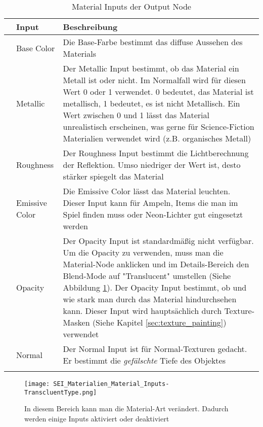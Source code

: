 \begin{longtable}{|p{4cm}|p{9.6cm}|}
    \hline
    \endfirsthead
    & \textbf{Input} & \textbf{Beschreibung} &\\
    \hline
    \endhead

    & Base Color & Die Base-Farbe bestimmt das diffuse Aussehen des Materials & \\

    & Metallic & Der Metallic Input bestimmt, ob das Material ein Metall ist oder nicht. Im Normalfall wird für
    diesen Wert 0 oder 1 verwendet. 0 bedeutet, das Material ist metallisch, 1 bedeutet, es ist nicht
    Metallisch. Ein Wert zwischen 0 und 1 lässt das Material unrealistisch erscheinen, was gerne
    für Science-Fiction Materialien verwendet wird (z.B. organisches Metall) & \\

    & Roughness & Der Roughness Input bestimmt die Lichtberechnung der Reflektion. Umso niedriger der Wert
    ist, desto stärker spiegelt das Material & \\

    & Emissive Color & Die Emissive Color lässt das Material leuchten. Dieser Input kann für Ampeln, Items die man im Spiel
    finden muss oder Neon-Lichter gut eingesetzt werden & \\

    & Opacity & Der Opacity Input ist standardmäßig nicht verfügbar. Um die Opacity zu verwenden, muss man die
    Material-Node anklicken und im Details-Bereich den Blend-Mode auf "Translucent" umstellen (Siehe
    Abbildung \ref{picture:translucent}). Der Opacity Input bestimmt, ob und wie stark man durch das Material hindurchsehen
    kann. Dieser Input wird hauptsächlich durch Texture-Masken (Siehe Kapitel \ref{sec:texture_painting}) verwendet & \\

    & Normal & Der Normal Input ist für Normal-Texturen gedacht. Er bestimmt die \textit{gefälschte} Tiefe des Objektes & \\

    \caption{Material Inputs der Output Node}
    \label{table:mat_inputs}
\end{longtable}

\begin{figure}[h]
    \centering
    \texttt{[image: SEI\_Materialien\_Material\_Inputs-TranscluentType.png]}
    \caption{In diesem Bereich kann man die Material-Art verändert. Dadurch werden einige Inputs aktiviert oder deaktiviert}
    \label{picture:translucent}
\end{figure}


